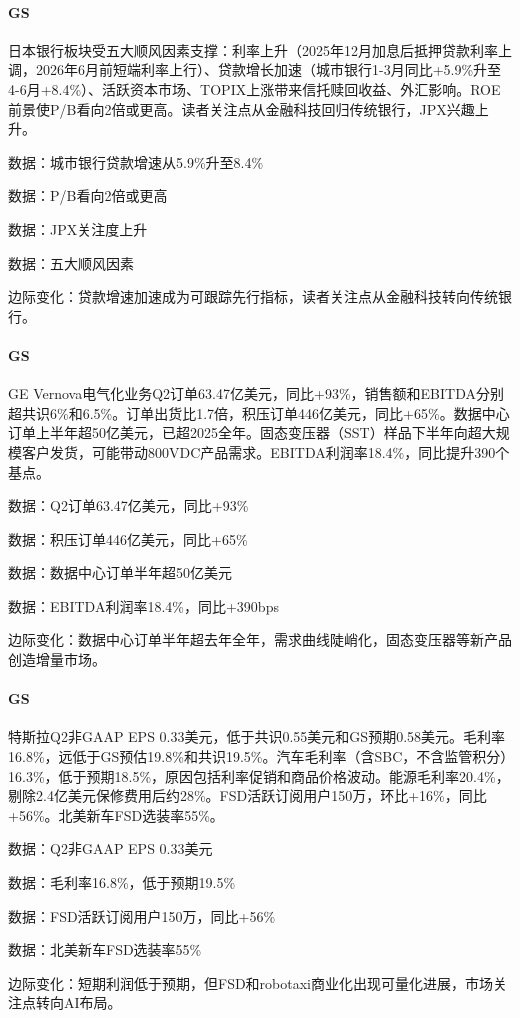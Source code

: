 \documentclass[11pt]{ctexart}
\begin{document}
\paragraph{GS} 日本银行板块受五大顺风因素支撑：利率上升（2025年12月加息后抵押贷款利率上调，2026年6月前短端利率上行）、贷款增长加速（城市银行1-3月同比+5.9\%升至4-6月+8.4\%）、活跃资本市场、TOPIX上涨带来信托赎回收益、外汇影响。ROE前景使P/B看向2倍或更高。读者关注点从金融科技回归传统银行，JPX兴趣上升。
{\small\color{refgray}数据：城市银行贷款增速从5.9\%升至8.4\%\par}
{\small\color{refgray}数据：P/B看向2倍或更高\par}
{\small\color{refgray}数据：JPX关注度上升\par}
{\small\color{refgray}数据：五大顺风因素\par}
{\small\color{refgray}边际变化：贷款增速加速成为可跟踪先行指标，读者关注点从金融科技转向传统银行。\par}
\paragraph{GS} GE Vernova电气化业务Q2订单63.47亿美元，同比+93\%，销售额和EBITDA分别超共识6\%和6.5\%。订单出货比1.7倍，积压订单446亿美元，同比+65\%。数据中心订单上半年超50亿美元，已超2025全年。固态变压器（SST）样品下半年向超大规模客户发货，可能带动800VDC产品需求。EBITDA利润率18.4\%，同比提升390个基点。
{\small\color{refgray}数据：Q2订单63.47亿美元，同比+93\%\par}
{\small\color{refgray}数据：积压订单446亿美元，同比+65\%\par}
{\small\color{refgray}数据：数据中心订单半年超50亿美元\par}
{\small\color{refgray}数据：EBITDA利润率18.4\%，同比+390bps\par}
{\small\color{refgray}边际变化：数据中心订单半年超去年全年，需求曲线陡峭化，固态变压器等新产品创造增量市场。\par}
\paragraph{GS} 特斯拉Q2非GAAP EPS 0.33美元，低于共识0.55美元和GS预期0.58美元。毛利率16.8\%，远低于GS预估19.8\%和共识19.5\%。汽车毛利率（含SBC，不含监管积分）16.3\%，低于预期18.5\%，原因包括利率促销和商品价格波动。能源毛利率20.4\%，剔除2.4亿美元保修费用后约28\%。FSD活跃订阅用户150万，环比+16\%，同比+56\%。北美新车FSD选装率55\%。
{\small\color{refgray}数据：Q2非GAAP EPS 0.33美元\par}
{\small\color{refgray}数据：毛利率16.8\%，低于预期19.5\%\par}
{\small\color{refgray}数据：FSD活跃订阅用户150万，同比+56\%\par}
{\small\color{refgray}数据：北美新车FSD选装率55\%\par}
{\small\color{refgray}边际变化：短期利润低于预期，但FSD和robotaxi商业化出现可量化进展，市场关注点转向AI布局。\par}
\end{document}
